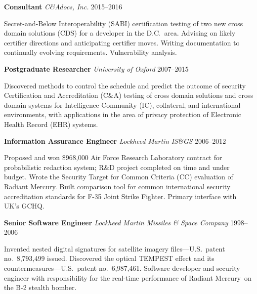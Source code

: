 \vspace{3mm}
\noindent\textbf{Consultant}
    \hfill \emph{C\&Adocs, Inc.} \hfill 2015--2016

    \vspace{1mm}
    \noindent Secret-and-Below Interoperability (SABI) certification
    testing of two new cross domain solutions (CDS) for a developer in the
    D.C.\ area. Advising on likely certifier directions and anticipating
    certifier moves. Writing documentation to continually evolving
    requirements. Vulnerability analysis.

\vspace{2mm}
\noindent\textbf{Postgraduate Researcher}
    \hfill \emph{University of Oxford} \hfill 2007--2015

    \vspace{1mm}
    \noindent Discovered methods to control the schedule and predict the
    outcome of security Certification and Accreditation (C\&A)
    testing of cross domain solutions and cross domain systems for
    Intelligence Community (IC), collateral, and international
    environments, with applications in the area of privacy protection
    of Electronic Health Record (EHR) systems.

\vspace{2mm}
\noindent\textbf{Information Assurance Engineer}
    \hfill \emph{Lockheed Martin IS\&GS} \hfill 2006--2012

    \vspace{1mm}
    \noindent Proposed and won \$968,000 Air Force Research Laboratory
    contract for probabilistic redaction system; R\&D
    project completed on time and under budget. Wrote the
    Security Target for Common Criteria (CC) evaluation of Radiant
    Mercury\rmtrademark. Built comparison tool for common international
    security accreditation standards for F-35 Joint Strike Fighter.
    Primary interface with UK's GCHQ.

\vspace{2mm}
\noindent\textbf{Senior Software Engineer}
    \hfill \emph{Lockheed Martin Missiles \& Space Company} \hfill 1998--2006

    \vspace{1mm}
    \noindent Invented nested digital signatures for satellite imagery
    files---U.S.\ patent no.~8,793,499 issued. Discovered the
    optical TEMPEST effect and its countermeasures---U.S.\ patent
    no.~6,987,461. Software developer and security engineer with
    responsibility for the real-time performance of Radiant
    Mercury\rmtrademark\ on the B-2 stealth bomber.

